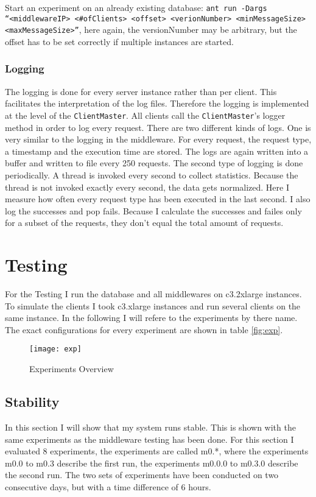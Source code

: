 \documentclass[
10pt, %
a4paper, %
oneside, %
headinclude,footinclude, %
BCOR5mm, %
]{scrartcl}
\begin{document}
Start an experiment on an already existing database:
\texttt{ant run -Dargs ``<middlewareIP> <\#ofClients> <offset> <verionNumber> <minMessageSize> <maxMessageSize>''}, here again, the versionNumber may be arbitrary, but the offset has to be set correctly if multiple instances are started.


\subsubsection{Logging}
The logging is done for every server instance rather than per client. This facilitates the interpretation of the log files. Therefore the logging is implemented at the level of the \texttt{ClientMaster}. All clients call the \texttt{ClientMaster}'s logger method in order to log every request. There are two different kinds of logs. One is very similar to the logging in the middleware. For every request, the request type, a timestamp and the execution time are stored. The logs are again written into a buffer and written to file every 250 requests. 
The second type of logging is done periodically. A thread is invoked every second to collect statistics. Because the thread is not invoked exactly every second, the data gets normalized. Here I measure how often every request type has been executed in the last second. I also log the successes and pop fails. Because I calculate the successes and failes only for a subset of the requests, they don't equal the total amount of requests.


\section{Testing}
For the Testing I run the database and all middlewares on c3.2xlarge instances. To simulate the clients I took c3.xlarge instances and run several clients on the same instance. In the following I will refere to the experiments by there name. The exact configurations for every experiment are shown in table \vref{fig:exp}.

\begin{figure}[H]
\begin{adjustwidth}{-2in}{-2in}
\centering
\texttt{[image: exp]}
\caption{Experiments Overview}
\label{fig:exp}
\end{adjustwidth}
\end{figure}


\subsection{Stability}
In this section I will show that my system runs stable. This is shown with the same experiments as the middleware testing has been done. For this section I evaluated 8 experiments, the experiments are called m0.*, where the experiments m0.0 to m0.3 describe the first run, the experiments m0.0.0 to m0.3.0 describe the second run. The two sets of experiments have been conducted on two consecutive days, but with a time difference of 6 hours.
\end{document}

